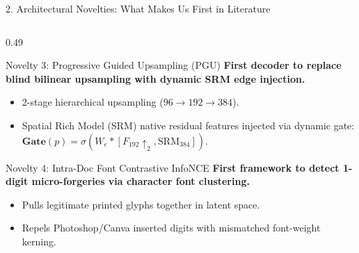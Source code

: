 \documentclass[aspectratio=169, 10pt]{beamer}
\begin{document}
\begin{frame}{2. Architectural Novelties: What Makes Us First in Literature}
\begin{columns}[T]
    \begin{column}{0.49\textwidth}
      \begin{successbox}{Novelty 3: Progressive Guided Upsampling (PGU)}
        \textbf{First decoder to replace blind bilinear upsampling with dynamic SRM edge injection.}
        \begin{itemize}\scriptsize
          \item 2-stage hierarchical upsampling ($96 \to 192 \to 384$).
          \item Spatial Rich Model (SRM) native residual features injected via dynamic gate: $\mathbf{Gate}(p) = \sigma(W_e * [F_{192}\uparrow_2, \text{SRM}_{384}])$.
        \end{itemize}
      \end{successbox}
      \vspace{1mm}
      \begin{successbox}{Novelty 4: Intra-Doc Font Contrastive InfoNCE}
        \textbf{First framework to detect 1-digit micro-forgeries via character font clustering.}
        \begin{itemize}\scriptsize
          \item Pulls legitimate printed glyphs together in latent space.
          \item Repels Photoshop/Canva inserted digits with mismatched font-weight kerning.
        \end{itemize}
      \end{successbox}
    \end{column}
  \end{columns}
\end{frame}
\end{document}

